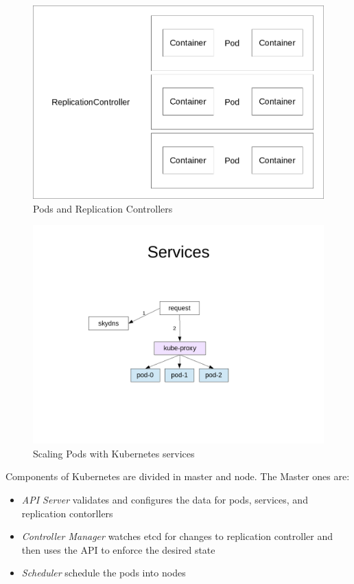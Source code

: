 \begin{figure}[htbp]
\centering
\includegraphics{media/ch5-pods-rcs.png}
\caption{Pods and Replication Controllers}
\end{figure}

\begin{figure}[htbp]
\centering
\includegraphics{media/ch5-services.png}
\caption{Scaling Pods with Kubernetes services}
\end{figure}

Components of Kubernetes are divided in master and node. The Master ones
are:

\begin{itemize}
\itemsep1pt\parskip0pt
\item
  \emph{API Server} validates and configures the data for pods,
  services, and replication contorllers
\item
  \emph{Controller Manager} watches etcd for changes to replication
  controller and then uses the API to enforce the desired state
\item
  \emph{Scheduler} schedule the pods into nodes
\end{itemize}

